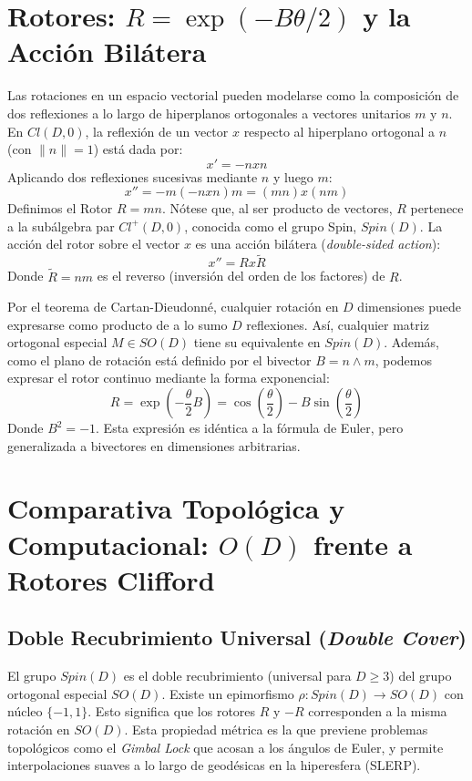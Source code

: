 \section{Rotores: $R = \exp(-B\theta/2)$ y la Acción Bilátera}

Las rotaciones en un espacio vectorial pueden modelarse como la composición de dos reflexiones a lo largo de hiperplanos ortogonales a vectores unitarios $m$ y $n$. En $Cl(D,0)$, la reflexión de un vector $x$ respecto al hiperplano ortogonal a $n$ (con $\|n\|=1$) está dada por:
\begin{equation}
    x' = -n x n
\end{equation}
Aplicando dos reflexiones sucesivas mediante $n$ y luego $m$:
\begin{equation}
    x'' = -m (-n x n) m = (mn) x (nm)
\end{equation}
Definimos el Rotor $R = mn$. Nótese que, al ser producto de vectores, $R$ pertenece a la subálgebra par $Cl^+(D,0)$, conocida como el grupo Spin, $Spin(D)$. La acción del rotor sobre el vector $x$ es una acción bilátera (\textit{double-sided action}):
\begin{equation}
    x'' = R x \tilde{R}
\end{equation}
Donde $\tilde{R} = nm$ es el reverso (inversión del orden de los factores) de $R$. 

Por el teorema de Cartan-Dieudonné, cualquier rotación en $D$ dimensiones puede expresarse como producto de a lo sumo $D$ reflexiones. Así, cualquier matriz ortogonal especial $M \in SO(D)$ tiene su equivalente en $Spin(D)$. Además, como el plano de rotación está definido por el bivector $B = n \wedge m$, podemos expresar el rotor continuo mediante la forma exponencial:
\begin{equation}
    R = \exp\left(-\frac{\theta}{2} B\right) = \cos\left(\frac{\theta}{2}\right) - B \sin\left(\frac{\theta}{2}\right)
\end{equation}
Donde $B^2 = -1$. Esta expresión es idéntica a la fórmula de Euler, pero generalizada a bivectores en dimensiones arbitrarias.

\section{Comparativa Topológica y Computacional: $O(D)$ frente a Rotores Clifford}

\subsection{Doble Recubrimiento Universal (\textit{Double Cover})}
El grupo $Spin(D)$ es el doble recubrimiento (universal para $D \ge 3$) del grupo ortogonal especial $SO(D)$. Existe un epimorfismo $\rho: Spin(D) \to SO(D)$ con núcleo $\{-1, 1\}$. Esto significa que los rotores $R$ y $-R$ corresponden a la misma rotación en $SO(D)$. Esta propiedad métrica es la que previene problemas topológicos como el \textit{Gimbal Lock} que acosan a los ángulos de Euler, y permite interpolaciones suaves a lo largo de geodésicas en la hiperesfera (SLERP).

